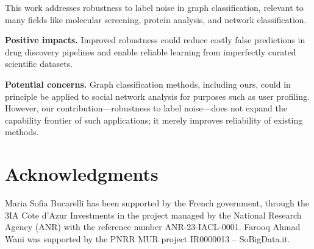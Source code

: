 \documentclass{article}
\theoremstyle{plain}
\theoremstyle{definition}
\theoremstyle{remark}
\begin{document}
This work addresses robustness to label noise in graph classification, relevant to many fields like molecular screening, protein analysis, and network classification. 

\textbf{Positive impacts.} Improved robustness could reduce costly false predictions in drug discovery pipelines and enable reliable learning from imperfectly curated scientific datasets.

\textbf{Potential concerns.} Graph classification methods, including ours, could in principle be applied to social network analysis for purposes such as user profiling. However, our contribution—robustness to label noise—does not expand the capability frontier of such applications; it merely improves reliability of existing methods.


\section*{Acknowledgments}
Maria Sofia Bucarelli has been supported by the French government, through the 3IA Cote d’Azur Investments in the project managed by the National Research Agency (ANR) with the reference number ANR-23-IACL-0001. Farooq Ahmad Wani was supported by the PNRR MUR project IR0000013 – SoBigData.it.









\newpage
\appendix



\end{document}
